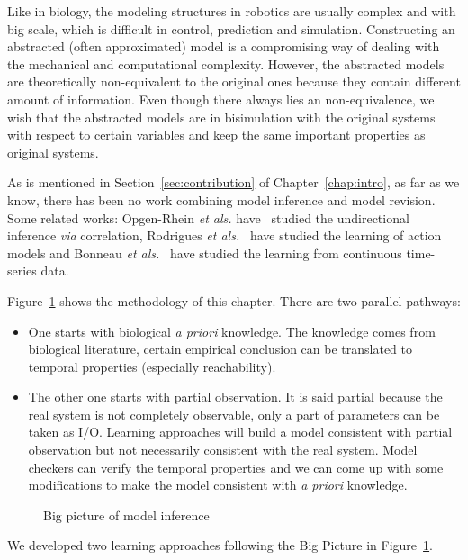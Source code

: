 Like in biology, the modeling structures in robotics are usually complex and with big scale, which is difficult in control, prediction and simulation.
Constructing an abstracted (often approximated) model is a compromising way of dealing with the mechanical and computational complexity.
However, the abstracted models are theoretically non-equivalent to the original ones because they contain different amount of information.
Even though there always lies an non-equivalence, we wish that the abstracted models are in bisimulation with the original systems with respect to certain variables and keep the same important properties as original systems.

As is mentioned in Section~\ref{sec:contribution} of Chapter~\ref{chap:intro}, as far as we know, there has been no work combining model inference and model revision.
Some related works: Opgen-Rhein \textit{et als.} have~\cite{opgen2007correlation} studied the undirectional inference \textit{via} correlation, Rodrigues \textit{et als.}~\cite{rodrigues2011active} have studied the learning of action models and Bonneau \textit{et als.}~\cite{bonneau2006inferelator} have studied the learning from continuous time-series data.

Figure~\ref{fig:bigPicture} shows the methodology of this chapter.
There are two parallel pathways: 
\begin{itemize}
    \item One starts with biological \textit{a priori} knowledge.
    The knowledge comes from biological literature, certain empirical conclusion can be translated to temporal properties (especially reachability).
    \item The other one starts with partial observation.
    It is said partial because the real system is not completely observable, only a part of parameters can be taken as I/O. 
    Learning approaches will build a model consistent with partial observation but not necessarily consistent with the real system.
    Model checkers can verify the temporal properties and we can come up with some modifications to make the model consistent with \textit{a priori} knowledge.
\end{itemize}

\begin{figure}[ht]
    \centering
    
    \caption{Big picture of model inference}\label{fig:bigPicture}
\end{figure}

We developed two learning approaches following the Big Picture in Figure~\ref{fig:bigPicture}.

